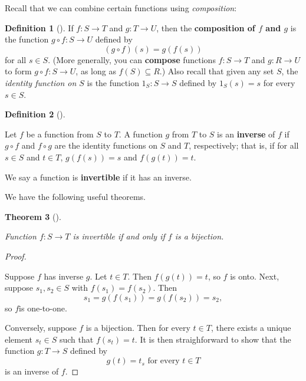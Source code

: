 \documentclass[10pt,]{book}
\newcommand{\terminology}[1]{\textbf{#1}}
\theoremstyle{plain}
\newtheorem{theorem}{Theorem}[section]
\theoremstyle{definition}
\newtheorem{definition}[theorem]{Definition}
\theoremstyle{definition}
\theoremstyle{definition}
\theoremstyle{definition}
\numberwithin{equation}{section}
\begin{document}
    Recall that we can combine certain functions using \emph{composition}:%
\begin{definition}[{}]\label{definition-10}
If \(f:S\to T\) and \(g:T\to U\), then the  \terminology{composition of \(f\) and \(g\)} is the function \(g\circ f: S\to U\) defined by %
\begin{equation*}
(g\circ f)(s)=g(f(s))
\end{equation*}
 for all \(s\in S\). (More generally, you can \terminology{compose} functions \(f:S\to T\) and \(g:R\to U\) to form \(g\circ f:S\to U\),  as long as \(f(S)\subseteq R\).) Also recall that given any set \(S\), the \emph{identity function on \(S\)} is the function \(1_S: S\to S\) defined by \(1_S(s)=s\) for every \(s\in S\).
  \label{notation-26}
\label{notation-27}
\end{definition}
\begin{definition}[{}]\label{definition-11}

        Let \(f\) be a function from \(S\) to \(T\). A function \(g\)
        from \(T\) to \(S\) is an \terminology{inverse} of \(f\) if \(g\circ f\) and
        \(f\circ g\) are the identity functions on \(S\) and \(T\),
        respectively; that is, if for all \(s\in S\) and \(t\in
        T\), \(g(f(s))=s\) and \(f(g(t))=t\). 

\par
We say a function is \terminology{invertible} if it has an inverse.%
\end{definition}
\par
We have the following useful theorems.%
\begin{theorem}[{}]\label{invbij}

        Function \(f:S\to T\) is invertible if and only if \(f\) is a bijection. 
\end{theorem}
\begin{proof}\hypertarget{proof-1}{}
Suppose \(f\) has inverse \(g\). Let \(t\in T\). Then \(f(g(t))=t\), so \(f\) is onto.  Next, suppose 
    \(s_1,s_2\in S\) with \(f(s_1)=f(s_2)\). Then %
\begin{equation*}
s_1=g(f(s_1))=g(f(s_2))=s_2,
\end{equation*}
 so \(f\)is one-to-one.%
\par
  Conversely, suppose \(f\) is a bijection.  Then for every \(t\in T\), there exists a unique element \(s_t\in S\) such that \(f(s_t)=t\). It is then straighforward to show that the function \(g:T\to S\) defined by %
\begin{equation*}
g(t)=t_s \text{ for every }t\in T
\end{equation*}
 is an inverse of \(f\).%
\end{proof}
\end{document}
